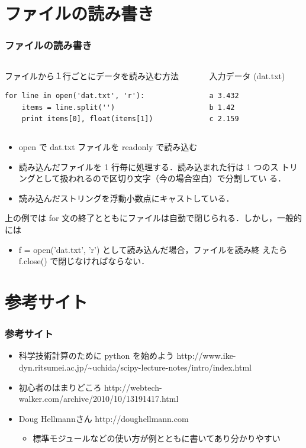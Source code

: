 \section{ファイルの読み書き}
\begin{frame}[t,fragile]
\frametitle{ファイルの読み書き}
\begin{columns}
\begin{column}{8cm}
ファイルから１行ごとにデータを読み込む方法
\begin{lstlisting}
for line in open('dat.txt', 'r'):
    items = line.split('')
    print items[0], float(items[1])
\end{lstlisting}
\end{column}
\begin{column}{4cm}
入力データ (dat.txt)
\begin{lstlisting}
a 3.432
b 1.42
c 2.159
\end{lstlisting}
\end{column}
\end{columns}

\begin{itemize}
\item open で dat.txt ファイルを readonly で読み込む
\item 読み込んだファイルを 1 行毎に処理する．読み込まれた行は 1 つのス
      トリングとして扱われるので区切り文字（今の場合空白）で分割してい
      る．
\item 読み込んだストリングを浮動小数点にキャストしている．
\end{itemize}
上の例では for 文の終了とともにファイルは自動で閉じられる．しかし，一般的には
\begin{itemize}
\item f = open('dat.txt', 'r') として読み込んだ場合，ファイルを読み終
      えたら f.close() で閉じなければならない．
\end{itemize}
\end{frame}

\section{参考サイト}
\begin{frame}[t]
\frametitle{参考サイト}
\begin{itemize}
\item 科学技術計算のために python を始めよう
      http://www.ike-dyn.ritsumei.ac.jp/\~{}uchida/scipy-lecture-notes/intro/index.html
\item 初心者のはまりどころ http://webtech-walker.com/archive/2010/10/13191417.html
\item Doug Hellmannさん http://doughellmann.com
      \begin{itemize}
      \item 標準モジュールなどの使い方が例とともに書いてあり分かりやすい
      \end{itemize}
\end{itemize}

\end{frame}



